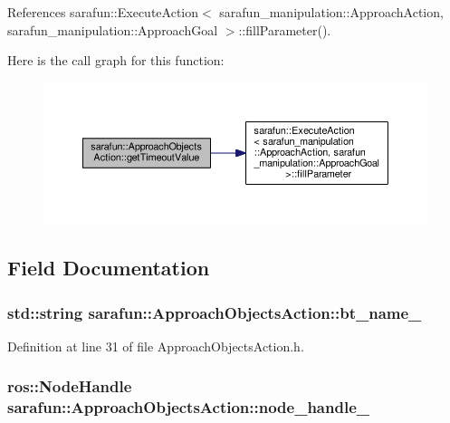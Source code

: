 References sarafun\-::\-Execute\-Action$<$ sarafun\-\_\-manipulation\-::\-Approach\-Action, sarafun\-\_\-manipulation\-::\-Approach\-Goal $>$\-::fill\-Parameter().



Here is the call graph for this function\-:\nopagebreak
\begin{figure}[H]
\begin{center}
\leavevmode
\includegraphics[width=350pt]{d6/db4/classsarafun_1_1ApproachObjectsAction_a6852994a6e8a1edf9b2c24c91fd07df2_a6852994a6e8a1edf9b2c24c91fd07df2_cgraph}
\end{center}
\end{figure}




\subsection{Field Documentation}
\hypertarget{classsarafun_1_1ApproachObjectsAction_ad56b6e84045b8e8156c9dcd1032f9e4e_ad56b6e84045b8e8156c9dcd1032f9e4e}{
\subsubsection[{bt\-\_\-name\-\_\-}]{\setlength{\rightskip}{0pt plus 5cm}std\-::string sarafun\-::\-Approach\-Objects\-Action\-::bt\-\_\-name\-\_\-\hspace{0.3cm}{\ttfamily [private]}}}\label{classsarafun_1_1ApproachObjectsAction_ad56b6e84045b8e8156c9dcd1032f9e4e_ad56b6e84045b8e8156c9dcd1032f9e4e}


Definition at line 31 of file Approach\-Objects\-Action.\-h.

\hypertarget{classsarafun_1_1ApproachObjectsAction_a34be70606c892761861b9d25d870a4fb_a34be70606c892761861b9d25d870a4fb}{
\subsubsection[{node\-\_\-handle\-\_\-}]{\setlength{\rightskip}{0pt plus 5cm}ros\-::\-Node\-Handle sarafun\-::\-Approach\-Objects\-Action\-::node\-\_\-handle\-\_\-\hspace{0.3cm}{\ttfamily [private]}}}\label{classsarafun_1_1ApproachObjectsAction_a34be70606c892761861b9d25d870a4fb_a34be70606c892761861b9d25d870a4fb}


